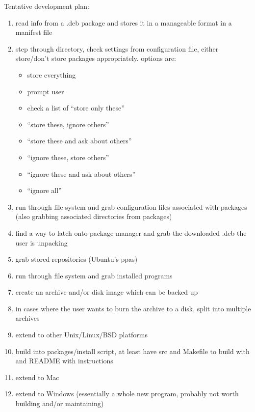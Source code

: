 \documentclass[12pt]{article}
\begin{document}
        Tentative development plan:
        \begin{enumerate}
            \item read info from a .deb package and stores it in a manageable format in a manifest file
            \item step through directory, check settings from configuration file, either store/don't store packages appropriately. options are: \begin{itemize}
                \item store everything
                \item prompt user
                \item check a list of ``store only these''
                \item ``store these, ignore others''
                \item ``store these and ask about others''
                \item ``ignore these, store others''
                \item ``ignore these and ask about others''
                \item ``ignore all''
            \end{itemize}
            \item run through file system and grab configuration files associated with packages (also grabbing associated directories from packages)
            \item find a way to latch onto package manager and grab the downloaded .deb the user is unpacking
            \item grab stored repositories (Ubuntu's ppas)
            \item run through file system and grab installed programs
            \item create an archive and/or disk image which can be backed up
            \item in cases where the user wants to burn the archive to a disk, split into multiple archives
            \item extend to other Unix/Linux/BSD platforms
            \item build into packages/install script, at least have src and Makefile to build with and README with instructions
            \item extend to Mac
            \item extend to Windows (essentially a whole new program, probably not worth building and/or maintaining)
        \end{enumerate}
\end{document}
